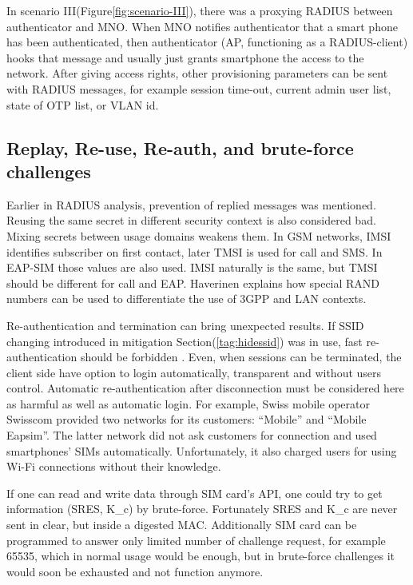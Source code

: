 \documentclass[12pt,a4paper,english]{tutthesis}
\begin{document}
In scenario III(Figure\ref{fig:scenario-III}),  there was a proxying RADIUS between authenticator
and MNO.  When MNO notifies authenticator
that a smart phone has been authenticated, then authenticator (AP, functioning
as a RADIUS-client) hooks that message and usually just grants
smartphone the access to the network. After giving access rights, other
provisioning parameters can be sent with RADIUS messages, for example
session time-out,
current admin user list, state of OTP list, or VLAN id.


\subsection{Replay, Re-use, Re-auth, and brute-force challenges}
\label{sec-6-5-3}
Earlier in RADIUS analysis, prevention of replied messages was
mentioned. Reusing the same secret in different security context is also
considered bad.  Mixing secrets between usage
domains weakens them.  In GSM networks, IMSI identifies subscriber on
first contact, later TMSI is used for call and SMS.  In EAP-SIM those
values are also used. IMSI naturally is the same, but TMSI should be
different for call and EAP.  Haverinen \cite{hav-doc} explains how
special RAND numbers can be used to differentiate the use of 3GPP and LAN
contexts.

Re-authentication and termination can bring unexpected results.
If SSID changing introduced in mitigation Section(\ref{tag:hidessid}) was in use, fast re-authentication
should be forbidden \cite[p.11]{rfc5448}.
Even, when sessions can be terminated, the client side have 
option to login automatically, transparent and without users control.
Automatic re-authentication after disconnection  must be considered
here as harmful as well as automatic login. For example,
Swiss mobile operator Swisscom provided two networks for its customers:
``Mobile'' and ``Mobile Eapsim''. The latter network did not ask customers
for connection and used smartphones' SIMs automatically. Unfortunately,
it also charged users for using Wi-Fi connections without their 
knowledge. \cite{swisscom}





If one can read and write data through SIM card's API,
one could try to get information (SRES, K\_c) by brute-force. 
Fortunately SRES and K\_c are never sent in clear, but inside
a digested MAC.
 Additionally SIM card can be programmed to answer only
limited number of challenge request, for example 65535, which in
normal usage would be enough, but in brute-force challenges 
it would soon be exhausted and not function anymore.
\end{document}
